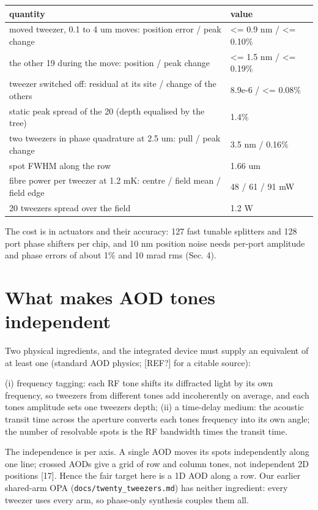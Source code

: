 {\small
\begin{longtable}[]{@{}ll@{}}
\toprule\noalign{}
quantity & value \\
\midrule\noalign{}
\endhead
\bottomrule\noalign{}
\endlastfoot
moved tweezer, 0.1 to 4 um moves: position error / peak change &
\textless= 0.9 nm / \textless= 0.10\% \\
the other 19 during the move: position / peak change & \textless= 1.5 nm
/ \textless= 0.19\% \\
tweezer switched off: residual at its site / change of the others &
8.9e-6 / \textless= 0.08\% \\
static peak spread of the 20 (depth equalised by the tree) & 1.4\% \\
two tweezers in phase quadrature at 2.5 um: pull / peak change & 3.5 nm
/ 0.16\% \\
spot FWHM along the row & 1.66 um \\
fibre power per tweezer at 1.2 mK: centre / field mean / field edge & 48
/ 61 / 91 mW \\
20 tweezers spread over the field & 1.2 W \\
\end{longtable}
}

The cost is in actuators and their accuracy: 127 fast tunable splitters
and 128 port phase shifters per chip, and 10 nm position noise needs
per-port amplitude and phase errors of about 1\% and 10 mrad rms (Sec.
4).

\hypertarget{2-what-makes-aod-tones-independent}{%
\section{What makes AOD tones
independent}\label{independent_steering-2-what-makes-aod-tones-independent}}

Two physical ingredients, and the integrated device must supply an
equivalent of at least one (standard AOD physics; {[}REF?{]} for a
citable source):

(i) frequency tagging: each RF tone shifts its diffracted light by its
own frequency, so tweezers from different tones add incoherently on
average, and each tone\textquotesingle s amplitude sets one
tweezer\textquotesingle s depth; (ii) a time-delay medium: the acoustic
transit time across the aperture converts each tone\textquotesingle s
frequency into its own angle; the number of resolvable spots is the RF
bandwidth times the transit time.

The independence is per axis. A single AOD moves its spots independently
along one line; crossed AODs give a grid of row and column tones, not
independent 2D positions {[}17{]}. Hence the fair target here is a 1D
AOD along a row. Our earlier shared-arm OPA
(\texttt{docs/twenty\_tweezers.md}) has neither ingredient: every
tweezer uses every arm, so phase-only synthesis couples them all.

